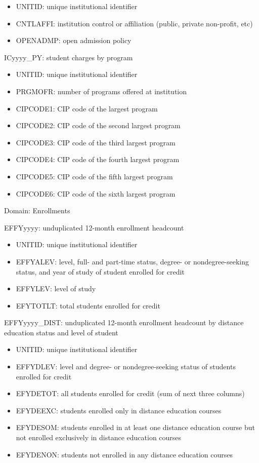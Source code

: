 \documentclass[sigconf, authorversion, nonacm]{acmart}
\begin{document}
    \begin{itemize}
        \item UNITID: unique institutional identifier
        \item CNTLAFFI: institution control or affiliation (public, private non-profit, etc)
        \item OPENADMP: open admission policy
    \end{itemize}

    ICyyyy\_PY: student charges by program

    \begin{itemize}
        \item UNITID: unique institutional identifier
        \item PRGMOFR: number of programs offered at institution
        \item CIPCODE1: CIP code of the largest program
        \item CIPCODE2: CIP code of the second largest program
        \item CIPCODE3: CIP code of the third largest program
        \item CIPCODE4: CIP code of the fourth largest program
        \item CIPCODE5: CIP code of the fifth largest program
        \item CIPCODE6: CIP code of the sixth largest program
    \end{itemize}

    Domain: Enrollments

    EFFYyyyy: unduplicated 12-month enrollment headcount

    \begin{itemize}
        \item UNITID: unique institutional identifier
        \item EFFYALEV: level, full- and part-time status, degree- or nondegree-seeking status, and year of study of student enrolled for credit
        \item EFFYLEV: level of study
        \item EFYTOTLT: total students enrolled for credit
    \end{itemize}

    EFFYyyyy\_DIST: unduplicated 12-month enrollment headcount by distance education status and level of student

    \begin{itemize}
        \item UNITID: unique institutional identifier
        \item EFFYDLEV: level and degree- or nondegree-seeking status of students enrolled for credit
        \item EFYDETOT: all students enrolled for credit (sum of next three columns)
        \item EFYDEEXC: students enrolled only in distance education courses
        \item EFYDESOM: students enrolled in at least one distance education course but not enrolled exclusively in distance education courses
        \item EFYDENON: students not enrolled in any distance education courses
    \end{itemize}
\end{document}
